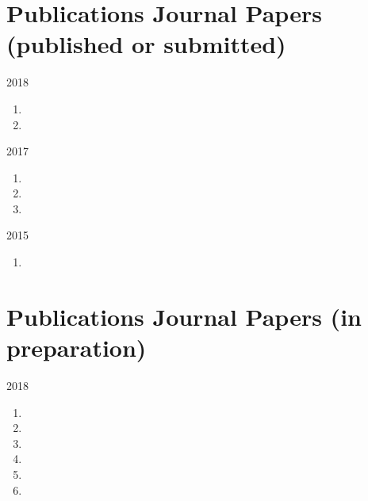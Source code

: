 
\section*{Publications {\small Journal Papers (published or submitted)}}

\begin{paracol}{2}
  \textsc{2018}
\switchcolumn
  \begin{enumerate}
    \item {}
    \item {}
    \setcounter{pubcounter}{\theenumi}
  \end{enumerate}
\end{paracol}

\begin{paracol}{2}
  \textsc{2017}
\switchcolumn
  \begin{enumerate}
    \setcounter{enumi}{\thepubcounter}
    \item {}
    \item {}
    \item {}
    \setcounter{pubcounter}{\theenumi}
  \end{enumerate}
\end{paracol}

\begin{paracol}{2}
  \textsc{2015}
\switchcolumn
  \begin{enumerate}
    \setcounter{enumi}{\thepubcounter}
    \item {}
    \setcounter{pubcounter}{\theenumi}
  \end{enumerate}
\end{paracol}

\section*{Publications {\small Journal Papers (in preparation)}}

\begin{paracol}{2}
  \textsc{2018}
\switchcolumn
    \begin{enumerate}
      \setcounter{enumi}{\thepubcounter}
      \item {}
      \item {}
      \item {}
      \item {}
      \item {}
      \item {}
      \setcounter{pubcounter}{\theenumi}
    \end{enumerate}
\end{paracol}

